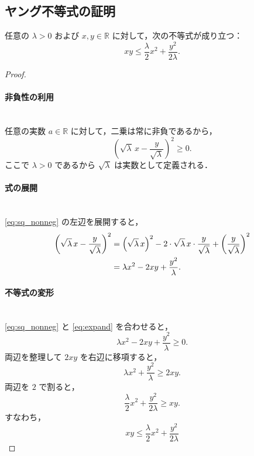 \documentclass[dvipdfmx,a4paper,11pt]{jsarticle}
\begin{document}
\subsection{ヤング不等式の証明}\label{pf:youngs_ineq}

\begin{lemma}[ヤング不等式]
\label{lemma:young}
任意の $\lambda > 0$ および $x, y \in \mathbb{R}$ に対して，次の不等式が成り立つ：
\begin{equation}
    xy \leq \frac{\lambda}{2} x^2 + \frac{y^2}{2\lambda}.
    \tag{A.13}
    \label{eq:young}
\end{equation}
\end{lemma}

\begin{proof}

\paragraph{非負性の利用}\ \\

任意の実数 $a \in \mathbb{R}$ に対して，二乗は常に非負であるから，
\begin{equation}
    \left(\sqrt{\lambda}\,x - \frac{y}{\sqrt{\lambda}}\right)^2 \geq 0.
    \label{eq:sq_nonneg}
\end{equation}
ここで $\lambda > 0$ であるから $\sqrt{\lambda}$ は実数として定義される．

\paragraph{式の展開}\ \\

\eqref{eq:sq_nonneg} の左辺を展開すると，
\begin{align}
    \left(\sqrt{\lambda}\,x - \frac{y}{\sqrt{\lambda}}\right)^2
    &= \left(\sqrt{\lambda}\,x\right)^2
       - 2 \cdot \sqrt{\lambda}\,x \cdot \frac{y}{\sqrt{\lambda}}
       + \left(\frac{y}{\sqrt{\lambda}}\right)^2 \notag \\
    &= \lambda x^2 - 2xy + \frac{y^2}{\lambda}.
    \label{eq:expand}
\end{align}

\paragraph{不等式の変形}\ \\

\eqref{eq:sq_nonneg} と \eqref{eq:expand} を合わせると，
\begin{equation}
    \lambda x^2 - 2xy + \frac{y^2}{\lambda} \geq 0.
\end{equation}
両辺を整理して $2xy$ を右辺に移項すると，
\begin{equation}
    \lambda x^2 + \frac{y^2}{\lambda} \geq 2xy.
\end{equation}
両辺を $2$ で割ると，
\begin{equation}
    \frac{\lambda}{2} x^2 + \frac{y^2}{2\lambda} \geq xy.
\end{equation}
すなわち，
\begin{equation}
    xy \leq \frac{\lambda}{2} x^2 + \frac{y^2}{2\lambda}
\end{equation}


\end{proof}
\end{document}

